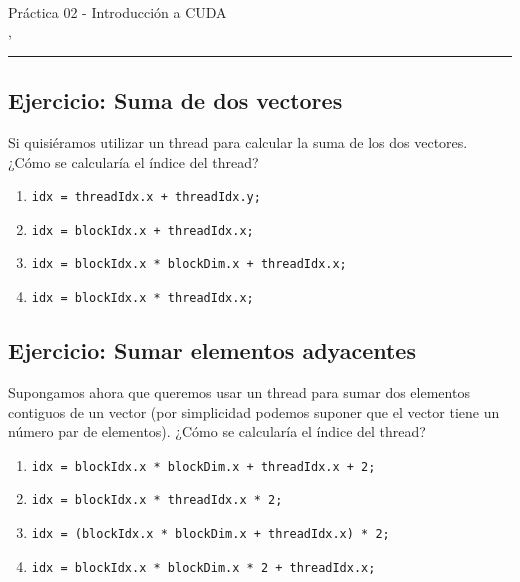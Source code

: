 



\begin{center}
  \LARGE\textbf{\coursename} \\
  \Large{Práctica 02 - Introducción a CUDA} \\
  \normalsize{\currentsemester, \currentyear} \\
  \vspace{1em}
  \hrule
\end{center}

\setcounter{section}{2}



\newpage

\tableofcontents

\newpage

\subsection{Ejercicio: Suma de dos vectores}

Si quisiéramos utilizar un thread para calcular la suma de los dos vectores. ¿Cómo se calcularía el índice del thread?

\begin{enumerate}[label=\roman*.]
  \item \texttt{idx = threadIdx.x + threadIdx.y;}
  \item \texttt{idx = blockIdx.x + threadIdx.x;}
  \item \texttt{idx = blockIdx.x * blockDim.x + threadIdx.x;}
  \item \texttt{idx = blockIdx.x * threadIdx.x;}
\end{enumerate}

\subsection{Ejercicio: Sumar elementos adyacentes}

Supongamos ahora que queremos usar un thread para sumar dos elementos contiguos de un vector (por simplicidad podemos
suponer que el vector tiene un número par de elementos). ¿Cómo se calcularía el índice del thread?

\begin{enumerate}[label=\roman*.]
  \item \texttt{idx = blockIdx.x * blockDim.x + threadIdx.x + 2;}
  \item \texttt{idx = blockIdx.x * threadIdx.x * 2;}
  \item \texttt{idx = (blockIdx.x * blockDim.x + threadIdx.x) * 2;}
  \item \texttt{idx = blockIdx.x * blockDim.x * 2 + threadIdx.x;}
\end{enumerate}


